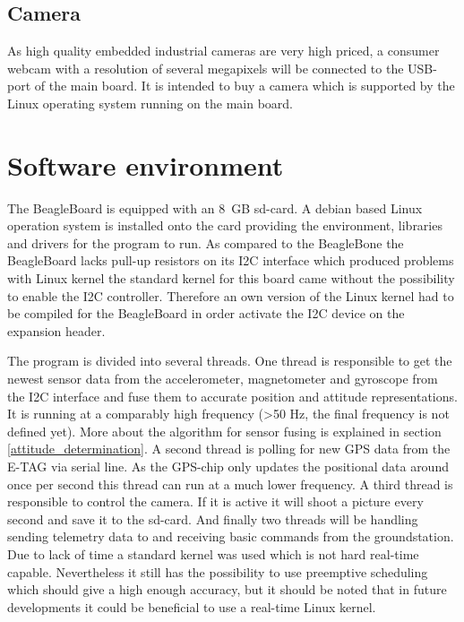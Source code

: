 \subsection*{Camera}

As high quality embedded industrial cameras are very high priced, a consumer
webcam with a resolution of several megapixels will be connected to the USB-port
of the main board. It is intended to buy a camera which is supported by the
Linux operating system running on the main board.



\FloatBarrier
\section{Software environment}

The BeagleBoard is equipped with an 8~GB sd-card. A debian based Linux
operation system is installed onto the card providing the environment,
libraries and drivers for the program to run. As compared to the BeagleBone the
BeagleBoard lacks pull-up resistors on its I2C interface which produced
problems with Linux kernel the standard kernel for this board came without the
possibility to enable the I2C controller. Therefore an own version of the Linux
kernel had to be compiled for the BeagleBoard in order activate the I2C device
on the expansion header. 

The program is divided into several threads. One thread is responsible to get
the newest sensor data from the accelerometer, magnetometer and gyroscope
from the I2C interface and fuse them to accurate position and attitude
representations. It is running at a comparably high frequency (>50 Hz, the final
frequency is not defined yet). More about the algorithm for sensor fusing is
explained in section \ref{attitude_determination}. A second thread is polling for new GPS data from
the E-TAG via serial line. As the GPS-chip only updates the positional data
around once per second this thread can run at a much lower frequency.
A third thread is responsible to control the camera. If it is active it will
shoot a picture every second and save it to the sd-card. And finally two
threads will be handling sending telemetry data to and receiving basic commands
from the groundstation. 
Due to lack of time a standard kernel was used which is not hard real-time
capable. Nevertheless it still has the possibility to use preemptive scheduling
which should give a high enough accuracy, but it should be noted that in future
developments it could be beneficial to use a real-time Linux kernel. 

